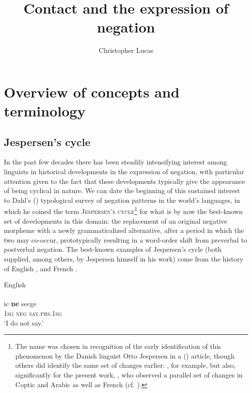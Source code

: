 \documentclass[output=paper]{langsci/langscibook}
\author{Christopher Lucas\affiliation{SOAS University of London}}
\title{Contact and the expression of negation}
\begin{document}
\maketitle 


 


\section{Overview of concepts and terminology}


\subsection{Jespersen’s cycle}


In the past few decades there has been steadily intensifying interest among linguists in historical developments in the expression of negation, with particular attention given to the fact that these developments typically give the appearance of being cyclical in nature. We can date the beginning of this sustained interest to Dahl's (\citeyear{Dahl1979}) typological survey of negation patterns in the world’s languages, in which he coined the term \textsc{Jespersen’s} \textsc{cycle}\footnote{The name was chosen in recognition of the early identification of this phenomenon by the Danish linguist Otto Jespersen in a (\citeyear{Jespersen1917}) article, though others did identify the same set of changes earlier: \citet{Meillet1912}, for example, but also, significantly for the present work, \citet{Gardiner1904}, who observed a parallel set of changes in Coptic and Arabic as well as French (cf. \citealt{Auwera2009}).} for what is by now the best-known set of developments in this domain: the replacement of an original negative morpheme with a newly grammaticalized alternative, after a period in which the two may co-occur, prototypically resulting in a word-order shift from preverbal to postverbal negation. The best-known examples of Jespersen’s cycle (both supplied, among others, by Jespersen himself in his \citeyear{Jespersen1917} work) come from the history of English , and French .

\ea\label{eng}
{English \citep[9]{Jespersen1917}}\\
\\
\gll ic \textbf{ne} secge\\
     \textsc{1sg}  \textsc{neg} \textsc{\textup{say}}.\textsc{prs.1sg}  \\
\glt ‘I do not say.’
\end{document}
